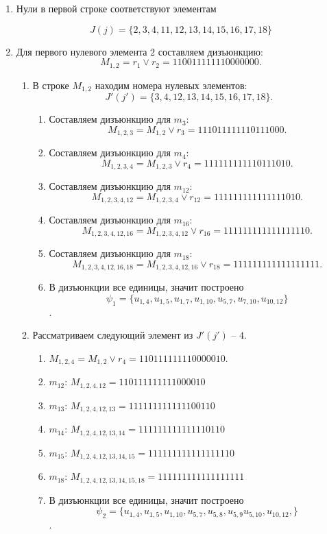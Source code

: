 \documentclass[12pt, a4paper] {ncc}
\begin{document}
\begin{enumerate}
\item Нули в первой строке соответствуют элементам

$$J(j) = \{2, 3, 4, 11, 12, 13, 14, 15, 16, 17, 18\}$$

\item Для первого нулевого элемента $2$ составляем дизъюнкцию:
 		$$M_{1,2} = r_1 \lor r_2 = 110011111110000000.$$

\begin{enumerate}
\item В строке $M_{1,2}$ находим номера нулевых элементов: $$J'(j') = \{ 3, 4, 12, 13, 14, 15, 16, 17, 18\}.$$
    \begin{enumerate}
        \item Составляем дизъюнкцию для $m_3$: $$M_{1,2,3} = M_{1,2} \lor r_3 = 111011111110111000.$$
        \item Составляем дизъюнкцию для $m_4$: $$M_{1,2,3,4} = M_{1,2, 3} \lor r_4 = 111111111110111010.$$
        \item Составляем дизъюнкцию для $m_{12}$: $$M_{1,2,3,4,12} = M_{1,2, 3, 4} \lor r_{12} = 111111111111111010.$$
        \item Составляем дизъюнкцию для $m_{16}$: $$M_{1,2,3,4,12,16} = M_{1,2, 3, 4,12} \lor r_{16} = 111111111111111110.$$
        \item Составляем дизъюнкцию для $m_{18}$: $$M_{1,2,3,4,12,16,18} = M_{1,2, 3, 4,12,16} \lor r_{18} = 111111111111111111.$$
        \item В дизъюнкции все единицы, значит построено $$\psi_1 = \{ u_{1,4}, u_{1,5}, u_{1,7}, u_{1,10}, u_{5,7}, u_{7,10}, u_{10,12} \}$$.
    \end{enumerate}
\item Рассматриваем следующий элемент из $J'(j')$ -- $4$.
    \begin{enumerate}
		\item $M_{1,2,4} = M_{1,2} \lor r_4 = 110111111110000010$.
		\item $m_{12}$: $M_{1,2,4,12} = 110111111111000010$
		\item $m_{13}$: $M_{1,2,4,12,13} = 111111111111100110$
		\item $m_{14}$: $M_{1,2,4,12,13,14} = 111111111111110110$
		\item $m_{15}$: $M_{1,2,4,12,13,14,15} = 111111111111111110$
		\item $m_{18}$: $M_{1,2,4,12,13,14,15,18} = 111111111111111111$
        \item В дизъюнкции все единицы, значит построено $$\psi_2 = \{ u_{1,4}, u_{1,5}, u_{1,10}, u_{5,7}, u_{5,8}, u_{5,9}  u_{5,10}, u_{10,12}, \}$$.

\end{enumerate}
\end{enumerate}
\end{enumerate}
\end{document}
